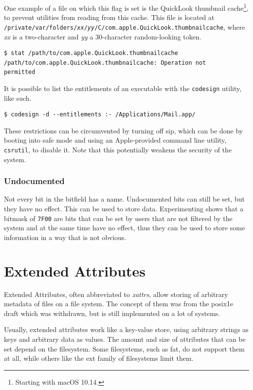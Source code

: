 \documentclass[a4paper]{article}
\begin{document}
One example of a file on which this flag is set is the QuickLook thumbnail cache\footnote{Starting with macOS 10.14.}, to prevent utilities from reading from this cache. This file is located at \texttt{/private/var/folders/\emph{xx}/\emph{yy}/C/com.apple.QuickLook.thumbnailcache}, where \emph{xx} is a two-character and \emph{yy} a 30-character random-looking token.

\begin{verbatim}
$ stat /path/to/com.apple.QuickLook.thumbnailcache
/path/to/com.apple.QuickLook.thumbnailcache: Operation not
permitted
\end{verbatim}
It is possible to list the entitlements of an executable with the \verb|codesign| utility, like such.

\begin{verbatim}
$ codesign -d --entitlements :- /Applications/Mail.app/
\end{verbatim}
These restrictions can be circumvented by turning off \gls{sip}, which can be done by booting into safe mode and using an Apple-provided command line utility, \verb|csrutil|, to disable it. Note that this potentially weakens the security of the system.

\subsubsection{Undocumented}

Not every bit in the bitfield has a name. Undocumented bits can still be set, but they have no effect. This can be used to store data. Experimenting shows that a bitmask of \verb|7F00| are bits that can be set by users that are not filtered by the system and at the same time have no effect, thus they can be used to store some information in a way that is not obvious.

\section{Extended Attributes}

Extended Attributes, often abbreviated to \emph{xattrs}, allow storing of arbitrary metadata of files on a file system. The concept of them was from the \gls{posix}\.1e draft which was withdrawn, but is still implemented on a lot of systems.

Usually, extended attributes work like a key-value store, using arbitrary strings as keys and arbitrary data as values. The amount and size of attributes that can be set depend on the filesystem. Some filesystems, such as \gls{fat}, do not support them at all, while others like the \gls{ext} family of filesystems limit them.
\end{document}
